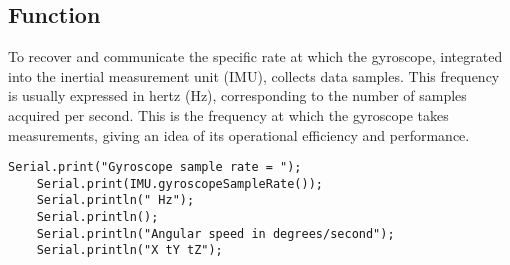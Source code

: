 \subsection{Function }

To recover and communicate the specific rate at which the gyroscope, integrated into the inertial measurement unit (IMU), collects data samples. This frequency is usually expressed in hertz (Hz), corresponding to the number of samples acquired per second. This is the frequency at which the gyroscope takes measurements, giving an idea of its operational efficiency and performance.

\begin{lstlisting}[style=Arduino]
    Serial.print("Gyroscope sample rate = ");
    Serial.print(IMU.gyroscopeSampleRate());
    Serial.println(" Hz");
    Serial.println();
    Serial.println("Angular speed in degrees/second");
    Serial.println("X tY tZ");
    
\end{lstlisting}

